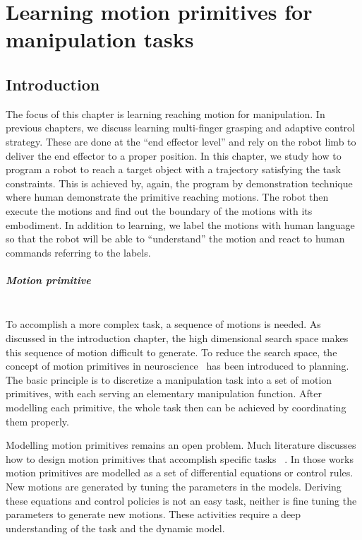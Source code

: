 \chapter{Learning motion primitives for manipulation tasks}
\label{cha5}

\section{Introduction}
\label{cha5:sec1}
The focus of this chapter is learning reaching motion for manipulation. In previous chapters, we discuss learning multi-finger grasping and adaptive control strategy. These are done at the ``end effector level'' and rely on the robot limb to deliver the end effector to a proper position. In this chapter, we study how to program a robot to reach a target object with a trajectory satisfying the task constraints. This is achieved by, again, the program by demonstration technique where human demonstrate the primitive reaching motions. The robot then execute the motions and find out the boundary of the motions with its embodiment. 
In addition to learning, we label the motions with human language so that the robot will be able to ``understand'' the motion and react to human commands referring to the labels. 

\paragraph{Motion primitive} ~\\
To accomplish a more complex task, a sequence of motions is needed. As discussed in the introduction chapter, the high dimensional search space makes this sequence of motion difficult to generate. To reduce the search space, the concept of motion primitives in neuroscience~\citep{bizzi2008combining} has been introduced to planning. The basic principle is to discretize a manipulation task into a set of motion primitives, with each serving an elementary manipulation function. After modelling each primitive, the whole task then can be achieved by coordinating them properly.

Modelling motion primitives remains an open problem. Much literature discusses how to design motion primitives that accomplish specific tasks ~\citep{michelman1994forming,felip2012manipulation,ijspeert2013dynamical}. In those works motion primitives are modelled as a set of differential equations or control rules. New motions are generated by tuning the parameters in the models. Deriving these equations and control policies is not an easy task, neither is fine tuning the parameters to generate new motions. These activities require a deep understanding of the task and the dynamic model.

